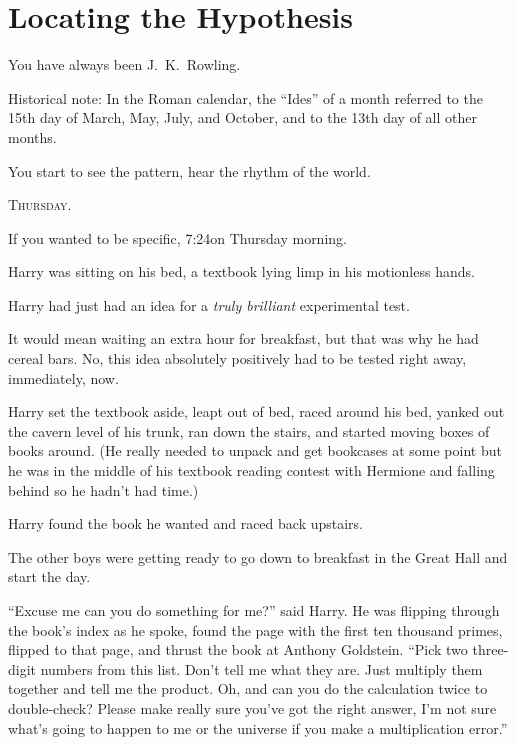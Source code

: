 \chapter{Locating the Hypothesis}

\begin{chapterOpeningAuthorNote}
You have always been J.~K.~Rowling.

Historical note: In the Roman calendar, the
“Ides” of a month referred to the 15th day of March, May, July, and October, and to the 13th day of all other months.
\end{chapterOpeningAuthorNote}
\begin{chapterOpeningQuote}
You start to see the pattern, hear the rhythm of the world.
\end{chapterOpeningQuote}

\lettrine{T}{hursday}.

\hplettrineextrapara
If you wanted to be specific, 7:24\am on Thursday morning.

Harry was sitting on his bed, a textbook lying limp in his motionless hands.

Harry had just had an idea for a \emph{truly brilliant} experimental test.

It would mean waiting an extra hour for breakfast, but that was why he had cereal bars. No, this idea absolutely positively had to be tested right away, immediately, now.

Harry set the textbook aside, leapt out of bed, raced around his bed, yanked out the cavern level of his trunk, ran down the stairs, and started moving boxes of books around. (He really needed to unpack and get bookcases at some point but he was in the middle of his textbook reading contest with Hermione and falling behind so he hadn’t had time.)

Harry found the book he wanted and raced back upstairs.

The other boys were getting ready to go down to breakfast in the Great Hall and start the day.

“Excuse me can you do something for me?” said Harry. He was flipping through the book’s index as he spoke, found the page with the first ten thousand primes, flipped to that page, and thrust the book at Anthony Goldstein.
“Pick two three-digit numbers from this list. Don’t tell me what they are. Just multiply them together and tell me the product. Oh, and can you do the calculation twice to double-check? Please make really sure you’ve got the right answer, I’m not sure what’s going to happen to me or the universe if you make a multiplication error.”

